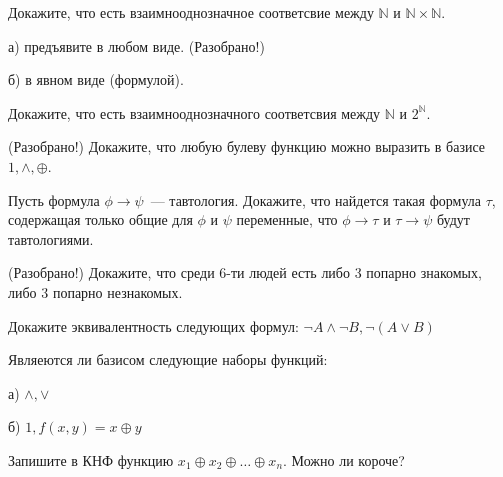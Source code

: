 \setcounter{curtask}{1}


\begin{task} 
    Докажите, что есть взаимнооднозначное соответсвие между $\mathbb{N}$ и
    $\mathbb{N} \times \mathbb{N}$.
    
    а) предъявите в любом виде. (Разобрано!)
    
    б) в явном виде (формулой).
\end{task}

\begin{task}
    Докажите, что есть взаимнооднозначного соответсвия между $\mathbb{N}$ и
    $2^{\mathbb{N}}$.
\end{task}

\begin{task} (Разобрано!)
    Докажите, что любую булеву функцию можно выразить в базисе $1, \wedge, \oplus$.
\end{task}

\begin{task}
    Пусть формула $\phi \rightarrow \psi$~--- тавтология. Докажите,
    что найдется такая формула $\tau$, содержащая только общие для
    $\phi$ и $\psi$ переменные, что $\phi \rightarrow \tau$ и
    $\tau \rightarrow \psi$ будут тавтологиями.
\end{task}

\begin{task} (Разобрано!)
    Докажите, что среди 6-ти людей есть либо 3 попарно знакомых, либо 3 попарно незнакомых.
\end{task}

\begin{task}
    Докажите эквивалентность следующих формул: $\neg A \wedge \neg B, \neg (A \vee B)$
\end{task}

\begin{task}
    Являеются ли базисом следующие наборы функций:

    а) $\wedge, \vee$

    б) $1, f(x, y) = x \oplus y$
\end{task}

\begin{task}
    Запишите в КНФ функцию $x_1 \oplus x_2 \oplus \dots \oplus x_n$. Можно ли короче?
\end{task}
